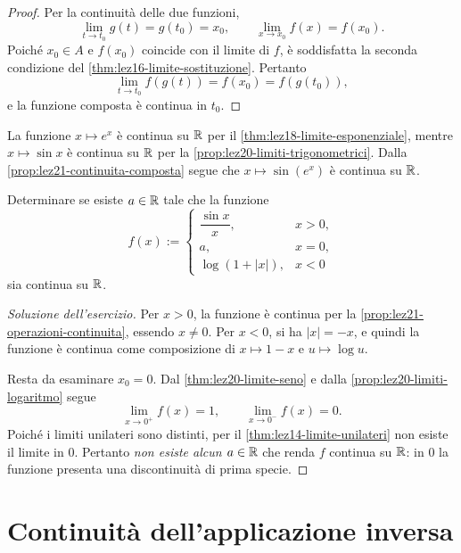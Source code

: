 \begin{proof}
Per la continuità delle due funzioni,
\[
  \lim_{t\to t_0}g(t)=g(t_0)=x_0,
  \qquad
  \lim_{x\to x_0}f(x)=f(x_0).
\]
Poiché \(x_0\in A\) e \(f(x_0)\) coincide con
il limite di \(f\), è soddisfatta la seconda
condizione del \cref{thm:lez16-limite-sostituzione}.
Pertanto
\[
  \lim_{t\to t_0}f(g(t))
  =f(x_0)=f(g(t_0)),
\]
e la funzione composta è continua in \(t_0\).
\end{proof}

\begin{example}
\label{ex:lez21-seno-esponenziale}
La funzione \(x\mapsto e^x\) è continua su \(\mathbb{R}\)
per il \cref{thm:lez18-limite-esponenziale},
mentre \(x\mapsto\sin x\) è continua su \(\mathbb{R}\)
per la \cref{prop:lez20-limiti-trigonometrici}.
Dalla \cref{prop:lez21-continuita-composta} segue
che \(x\mapsto\sin(e^x)\) è continua su \(\mathbb{R}\).
\end{example}

\begin{exercise}
\label{ex:lez21-continuita-tratti}
Determinare se esiste \(a\in\mathbb{R}\) tale che la funzione
\[
  f(x):=
  \begin{cases}
    \dfrac{\sin x}{x}, & x>0,\\[4pt]
    a, & x=0,\\[4pt]
    \log(1+|x|), & x<0
  \end{cases}
\]
sia continua su \(\mathbb{R}\).
\end{exercise}

\begin{proof}[Soluzione dell'esercizio]
Per \(x>0\), la funzione è continua per la
\cref{prop:lez21-operazioni-continuita}, essendo
\(x\ne0\). Per \(x<0\), si ha \(|x|=-x\),
e quindi la funzione è continua come composizione
di \(x\mapsto1-x\) e \(u\mapsto\log u\).

Resta da esaminare \(x_0=0\). Dal
\cref{thm:lez20-limite-seno} e dalla
\cref{prop:lez20-limiti-logaritmo} segue
\[
  \lim_{x\to0^+}f(x)=1,
  \qquad
  \lim_{x\to0^-}f(x)=0.
\]
Poiché i limiti unilateri sono distinti,
per il \cref{thm:lez14-limite-unilateri}
non esiste il limite in \(0\). Pertanto
\emph{non esiste alcun \(a\in\mathbb{R}\)} che renda
\(f\) continua su \(\mathbb{R}\): in \(0\) la funzione
presenta una discontinuità di prima specie.
\end{proof}

\section{Continuità dell'applicazione inversa}
\label{sec:lez21-continuita-inversa}


